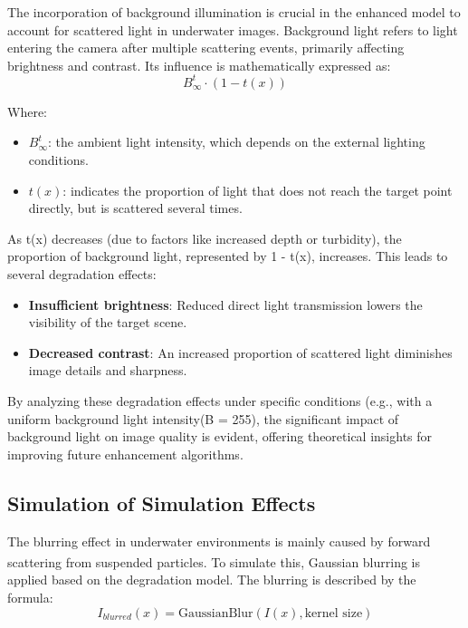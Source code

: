 \documentclass[withoutpreface,bwprint]{cumcmthesis}
\begin{document}
The incorporation of background illumination is crucial in the enhanced model to account for scattered light in underwater images. Background light refers to light entering the camera after multiple scattering events, primarily affecting brightness and contrast. Its influence is mathematically expressed as:
\[B_{\infty}^{t}\cdot (1 - t(x))\]

Where:

\begin{itemize}[itemindent=2em]
    \item  $B_{\infty}^{t}$: the ambient light intensity, which depends on the external lighting conditions. 

    \item $t(x)$: indicates the proportion of light that does not reach the target point directly, but is scattered several times. 
\end{itemize}

As t(x) decreases (due to factors like increased depth or turbidity), the proportion of background light, represented by 1 - t(x), increases. This leads to several degradation effects:

\begin{itemize}
    \item \textbf{Insufficient brightness}:  Reduced direct light transmission lowers the visibility of the target scene.
    \item \textbf{Decreased contrast}: An increased proportion of scattered light diminishes image details and sharpness.
\end{itemize}

By analyzing these degradation effects under specific conditions (e.g., with a uniform background light intensity(B = 255), the significant impact of background light on image quality is evident, offering theoretical insights for improving future enhancement algorithms.

\subsection{Simulation of Simulation Effects}

The blurring effect in underwater environments is mainly caused by forward scattering from suspended particles. To simulate this, Gaussian blurring\textsuperscript{\cite{gedraite2011investigation}} is applied based on the degradation model. The blurring is described by the formula:
\[I_{blurred}(x) = \text{GaussianBlur}(I(x), \text{kernel size})\]
\end{document}
